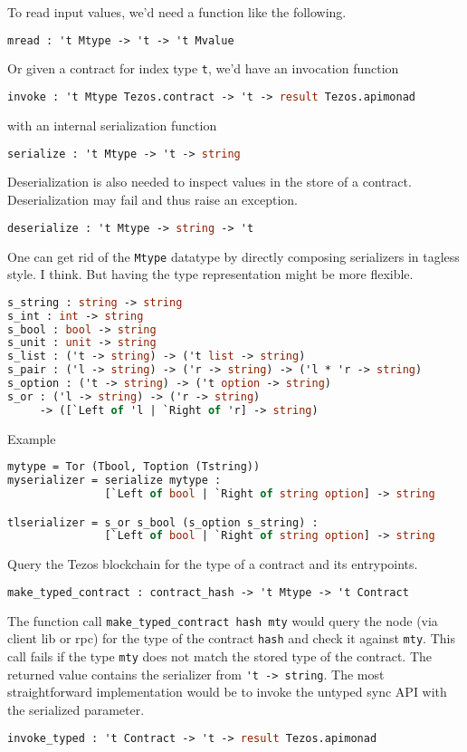 \documentclass{article}
\begin{document}
To read input values, we'd need a function like the following.
\begin{lstlisting}[language=Caml]
mread : 't Mtype -> 't -> 't Mvalue
\end{lstlisting}

Or given a contract for index type \lstinline/t/, we'd have an
invocation function
\begin{lstlisting}[language=Caml]
invoke : 't Mtype Tezos.contract -> 't -> result Tezos.apimonad
\end{lstlisting}
with an internal serialization function
\begin{lstlisting}[language=Caml]
serialize : 't Mtype -> 't -> string
\end{lstlisting}
Deserialization is also needed to inspect values in the store of a
contract. Deserialization may fail 
and thus raise an exception.
\begin{lstlisting}[language=Caml]
deserialize : 't Mtype -> string -> 't
\end{lstlisting}

One can get rid of the \lstinline/Mtype/ datatype by directly
composing serializers in tagless style. I think. But having the type
representation might be more flexible.
\begin{lstlisting}[language=Caml]
s_string : string -> string
s_int : int -> string
s_bool : bool -> string
s_unit : unit -> string
s_list : ('t -> string) -> ('t list -> string)
s_pair : ('l -> string) -> ('r -> string) -> ('l * 'r -> string)
s_option : ('t -> string) -> ('t option -> string)
s_or : ('l -> string) -> ('r -> string) 
     -> ([`Left of 'l | `Right of 'r] -> string)
\end{lstlisting}

Example
\begin{lstlisting}[language=Caml]
mytype = Tor (Tbool, Toption (Tstring))
myserializer = serialize mytype : 
               [`Left of bool | `Right of string option] -> string

tlserializer = s_or s_bool (s_option s_string) :
               [`Left of bool | `Right of string option] -> string
\end{lstlisting}

Query the Tezos blockchain for the type of a contract and its
entrypoints.
\begin{lstlisting}[language=Caml]
make_typed_contract : contract_hash -> 't Mtype -> 't Contract
\end{lstlisting}
The function call \lstinline/make_typed_contract hash mty/ would query
the node (via client lib or rpc) for the type of the contract
\lstinline/hash/ and check it against \lstinline/mty/.
This call fails if the type \lstinline/mty/ does not match the
stored type of the contract.
The returned value contains the serializer from \lstinline/'t -> string/. The most
straightforward implementation would be to invoke the untyped sync API
with the serialized parameter.
\begin{lstlisting}[language=Caml]
invoke_typed : 't Contract -> 't -> result Tezos.apimonad
\end{lstlisting}
\end{document}
